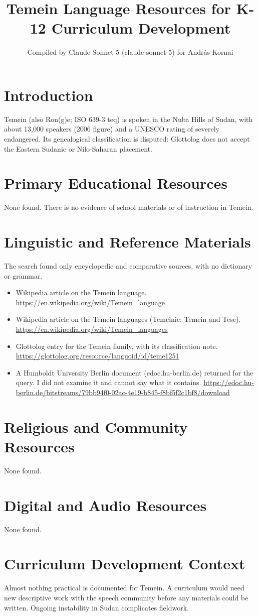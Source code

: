 \documentclass[12pt]{article}
\title{Temein Language Resources for K-12 Curriculum Development}
\author{Compiled by Claude Sonnet 5 (claude-sonnet-5) for Andr\'as Kornai}
\date{}
\begin{document}
\maketitle

\section{Introduction}
Temein (also Ron(g)e; ISO 639-3 teq) is spoken in the Nuba Hills of Sudan, with about 13,000 speakers (2006 figure) and a UNESCO rating of severely endangered. Its genealogical classification is disputed: Glottolog does not accept the Eastern Sudanic or Nilo-Saharan placement.

\section{Primary Educational Resources}
None found. There is no evidence of school materials or of instruction in Temein.

\section{Linguistic and Reference Materials}
The search found only encyclopedic and comparative sources, with no dictionary or grammar.
\begin{itemize}
\item Wikipedia article on the Temein language. \url{https://en.wikipedia.org/wiki/Temein_language}
\item Wikipedia article on the Temein languages (Temeinic: Temein and Tese). \url{https://en.wikipedia.org/wiki/Temein_languages}
\item Glottolog entry for the Temein family, with its classification note. \url{https://glottolog.org/resource/languoid/id/teme1251}
\item A Humboldt University Berlin document (edoc.hu-berlin.de) returned for the query. I did not examine it and cannot say what it contains. \url{https://edoc.hu-berlin.de/bitstreams/79bb94f0-02ac-4e19-b845-f8bf5f2c1bf8/download}
\end{itemize}

\section{Religious and Community Resources}
None found.

\section{Digital and Audio Resources}
None found.

\section{Curriculum Development Context}
Almost nothing practical is documented for Temein. A curriculum would need new descriptive work with the speech community before any materials could be written. Ongoing instability in Sudan complicates fieldwork.
\end{document}
